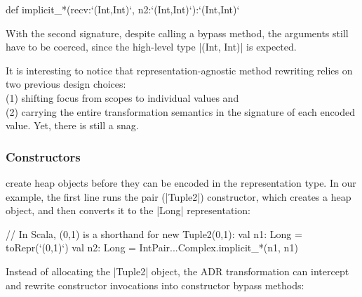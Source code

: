 \begin{lstlisting-nobreak}
def implicit_*(recv:`(Int,Int)`, n2:`(Int,Int)`):`(Int,Int)`
\end{lstlisting-nobreak}

With the second signature, despite calling a bypass method, the arguments still have to be coerced, since the high-level type |(Int, Int)| is expected.

It is interesting to notice that representation-agnostic method rewriting relies on two previous design choices: \\
(1) shifting focus from scopes to individual values and \\
(2) carrying the entire transformation semantics in the signature of each encoded value. %
%
Yet, there is still a snag.

\vspace{-0.4em}
\subsubsection{Constructors} create heap objects before they can be encoded in the representation type. In our example, the first line runs the pair (|Tuple2|) constructor, which creates a heap object, and then converts it to the |Long| representation:

\begin{lstlisting-nobreak}
// In Scala, (0,1) is a shorthand for new Tuple2(0,1):
val n1: Long = toRepr(`(0,1)`)
val n2: Long = IntPair...Complex.implicit_*(n1, n1)
\end{lstlisting-nobreak}

Instead of allocating the |Tuple2| object, the ADR transformation can intercept and rewrite constructor invocations into constructor bypass methods:

